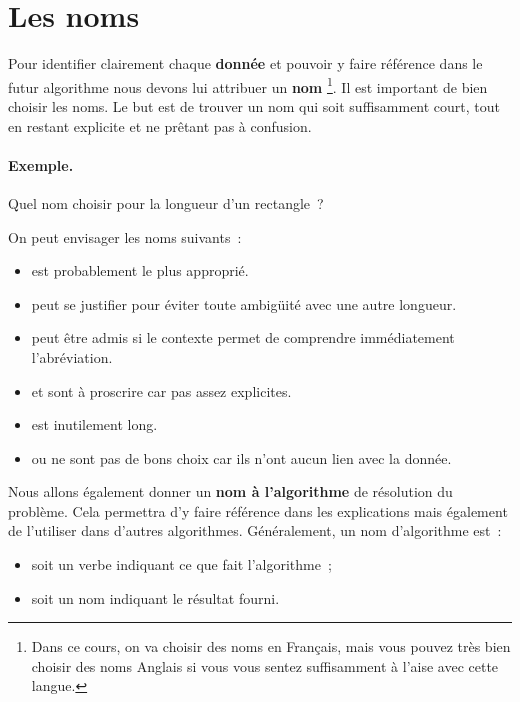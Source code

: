 	\section{Les noms}
	
		Pour identifier clairement chaque \textbf{donnée}
		et pouvoir y faire référence dans le futur algorithme
		nous devons lui attribuer un \textbf{nom}%
		\footnote{%
				Dans ce cours, on va choisir des noms en Français,
				mais vous pouvez très bien choisir
				des noms Anglais si vous vous sentez
				suffisamment à l’aise avec cette langue.
		}.
		Il est important de bien choisir les noms. 
		Le but est de trouver un nom qui soit suffisamment court,
		tout en restant explicite et ne prêtant pas à confusion.
		
\clearpage
	
		\begin{Emphase}
			\paragraph{Exemple.}	
			Quel nom choisir pour la longueur d’un rectangle~?
	
			On peut envisager les noms suivants~:
			\begin{itemize}
			\item
				 est probablement le plus approprié.
			\item
				 peut se justifier
				pour éviter toute ambigüité avec une autre longueur.
			\item
				 peut être admis
				si le contexte permet de comprendre immédiatement
				l’abréviation.
			\item
				 et  sont à proscrire car pas assez explicites.
			\item
				 est inutilement long. 
			\item
				 ou  ne sont pas de bons choix
				car ils n’ont aucun lien avec la donnée.
			\end{itemize}
		\end{Emphase}
		
		Nous allons également donner un \textbf{nom à l’algorithme}
		de résolution du problème.
		Cela permettra d’y faire référence dans les explications
		mais également de l’utiliser dans d’autres algorithmes.
		Généralement, un nom d’algorithme est~:
		\begin{itemize}
		\item soit un verbe indiquant ce que fait l’algorithme~;
		\item soit un nom indiquant le résultat fourni.	
		\end{itemize}
	
